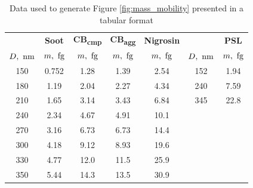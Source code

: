 \documentclass[12pt]{article}
\begin{document}
\begin{table}[!htp]
\centering
\caption{Data used to generate Figure \ref{fig:mass_mobility} presented in a tabular format}
\begin{tabular}{c c c c c c c}
\hline
    & \textbf{Soot} & \textbf{CB\textsubscript{cmp}} & \textbf{CB\textsubscript{agg}} & \textbf{Nigrosin} & & \textbf{PSL}\\
    $D,\rm\ nm$ & $m,\rm\ fg$ & $m,\rm\ fg$ & $m,\rm\ fg$ & $m,\rm\ fg$ & $D,\rm\ nm$ & $m,\rm\ fg$\\
\hline
    150 & 0.752 & 1.28 & 1.39 & 2.54 & 152 & 1.94\\
    180 & 1.19 & 2.04 & 2.27 & 4.34 & 240 & 7.59\\
    210 & 1.65 & 3.14 & 3.43 & 6.84 & 345 & 22.8\\
    240 & 2.34 & 4.67 & 4.91 & 10.1\\
    270 & 3.16 & 6.73 & 6.73 & 14.4\\
    300 & 4.18 & 9.12 & 8.93 & 19.6\\
    330 & 4.77 & 12.0 & 11.5 & 25.9\\
    350 & 5.44 & 14.3 & 13.5 & 30.9\\
\hline
\end{tabular}
\label{s:tab:tabulated-mobility}
\end{table}

 

\end{document}
